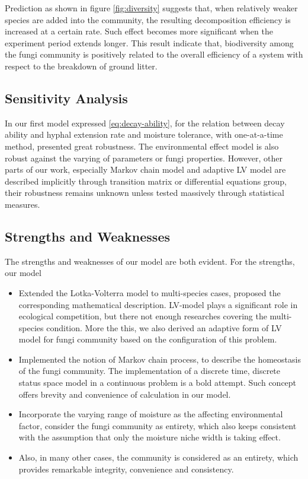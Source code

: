 Prediction as shown in figure \ref{fig:diversity} suggests that, when relatively weaker species are added into the community, the resulting decomposition efficiency is increased at a certain rate. Such effect becomes more significant when the experiment period extends longer. This result indicate that, biodiversity among the fungi community is positively related to the overall efficiency of a system with respect to the breakdown of ground litter.


\subsection{Sensitivity Analysis}

In our first model expressed \eqref{eq:decay-ability}, for the relation between decay ability and hyphal extension rate and moisture tolerance, with one-at-a-time method, presented great robustness. The environmental effect model is also robust against the varying of parameters or fungi properties. However, other parts of our work, especially Markov chain model and adaptive LV model are described implicitly through transition matrix or differential equations group, their robustness remains unknown unless tested massively through statistical measures.


\subsection{Strengths and Weaknesses}

The strengths and weaknesses of our model are both evident. For the strengths, our model

\begin{itemize}
    \item Extended the Lotka-Volterra model to multi-species cases, proposed the corresponding mathematical description. LV-model plays a significant role in ecological competition, but there not enough researches covering the multi-species condition. More the this, we also derived an adaptive form of LV model for fungi community based on the configuration of this problem.
    \item Implemented the notion of Markov chain process, to describe the homeostasis of the fungi community. The implementation of a discrete time, discrete status space model in a continuous problem is a bold attempt. Such concept offers brevity and convenience of calculation in our model.
    \item Incorporate the varying range of moisture as the affecting environmental factor, consider the fungi community as entirety, which also keeps consistent with the assumption that only the moisture niche width is taking effect.
    \item Also, in many other cases, the community is considered as an entirety, which provides remarkable integrity, convenience and consistency.
\end{itemize}

